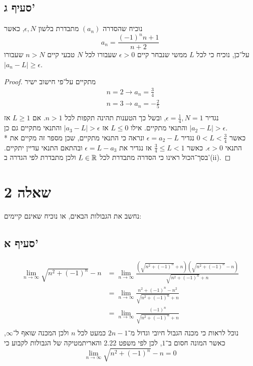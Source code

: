 \subsection{סעיף ג'}
נוכיח שהסדרה $(a_n)$ מתבדרת בלשון $\epsilon, N$, כאשר
\[
	a_n = \frac{{(-1)}^n n + 1}{n + 2}
\]
על־כן, נוכיח כי לכל $L$ ממשי שנבחר קיים $\epsilon > 0$ שעבורו לכל $N$ טבעי קיים $n > N$ שעבורו $\left| a_n - L \right| \ge \epsilon$.
\begin{proof}
	מתקיים על־פי חישוב ישיר
	\begin{align*}
		& n = 2 \rightarrow a_n = \frac{3}{4} \\
		& n = 3 \rightarrow a_n = -\frac{2}{5} \\
	\end{align*}
	נגדיר $\epsilon = \frac{1}{4}, N = 1$, ובשל כך הטענות תהינה תקפות לכל $n > 1$.
	אם $L \ge 1$ אז $|a_2 - L| > \epsilon$ והתנאי מתקיים.
	אילו $L \le 0$ אז $|a_3 - L| > \epsilon$ והתנאי מתקיים גם כן. \\*
	כאשר $0 < L < \frac{3}{4}$ נגדיר $\epsilon = a_2 - L$ ונראה כי התנאי מתקיים, שכן מספר זה מקיים את התנאי $\epsilon > 0$.
	כאשר $\frac{3}{4} \le L < 1$ אז נגדיר את $\epsilon = L - a_3$ ובהתאם התנאי עדיין יתקיים.
	בסך־הכול ראינו כי הסדרה מתבדרת לכל $L \in \mathbb{R}$ ולכן מתבדרת לפי הגדרה ב'(ii). %
\end{proof}

\section{שאלה 2}
נחשב את הגבולות הבאים, או נוכיח שאינם קיימים:

\subsection{סעיף א'}
\begin{align*}
	\lim_{n \to \infty} \sqrt{n^2 + {(-1)}^n} - n
	& = \lim_{n \to \infty} \frac{\left(\sqrt{n^2 + {(-1)}^n} + n\right)\left(\sqrt{n^2 + {(-1)}^n} - n\right)}{\sqrt{n^2 + {(-1)}^n} + n} \\
	& = \lim_{n \to \infty} \frac{n^2 + {(-1)}^n - n^2}{\sqrt{n^2 + {(-1)}^n} + n} \\
	& = \lim_{n \to \infty} \frac{{(-1)}^n}{\sqrt{n^2 + {(-1)}^n} + n} \\
\end{align*}
נוכל לראות כי מכנה הגבול חיובי וגדול מ־$2n - 1$ כמעט לכל $n$ ולכן המכנה שואף ל־$\infty$, כאשר המונה חסום ב־$1$,
לכן לפי משפט 2.22 והאריתמטיקה של הגבולות לקבוע כי
\[
	\lim_{n \to \infty} \sqrt{n^2 + {(-1)}^n} - n = 0
\]

